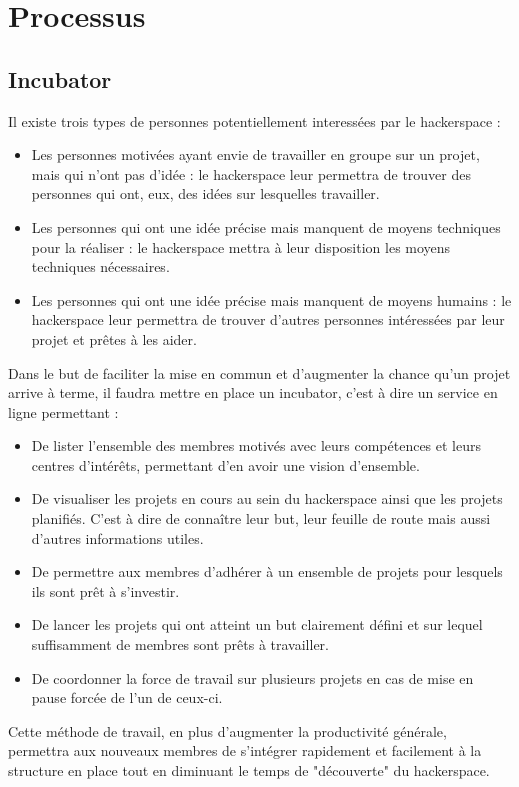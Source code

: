 \documentclass{article}
\begin{document}
\section{Processus}
\subsection{Incubator}

Il existe trois types de personnes potentiellement interessées par le hackerspace :
\begin{itemize}
\item Les personnes motivées ayant envie de travailler en groupe sur un projet, mais qui n'ont pas d'idée : 
le hackerspace leur permettra de trouver des personnes qui ont, eux, des idées sur lesquelles travailler.
\item Les personnes qui ont une idée précise mais manquent de moyens techniques pour la réaliser : 
le hackerspace mettra à leur disposition les moyens techniques nécessaires.
\item Les personnes qui ont une idée précise mais manquent de moyens humains : 
le hackerspace leur permettra de trouver d'autres personnes intéressées par leur projet et prêtes à les aider.
\end{itemize}

Dans le but de faciliter la mise en commun et d'augmenter la chance qu'un projet 
arrive à terme, il faudra mettre en place un incubator, c'est à dire un service en ligne permettant :
\begin{itemize}
\item De lister l'ensemble des membres motivés avec leurs compétences et leurs 
centres d'intérêts, permettant d'en avoir une vision d'ensemble.
\item De visualiser les projets en cours au sein du hackerspace ainsi que les projets planifiés. C'est à dire de connaître leur but, leur feuille de route mais aussi d'autres informations utiles. 
\item De permettre aux membres d'adhérer à un ensemble de projets pour lesquels ils sont prêt à s'investir.
\item De lancer les projets qui ont atteint un but clairement défini et sur lequel suffisamment de membres sont prêts à travailler.
\item De coordonner la force de travail sur plusieurs projets en cas de mise en pause forcée de l'un de ceux-ci.
\end{itemize}

Cette méthode de travail, en plus d'augmenter la productivité générale, permettra 
aux nouveaux membres de s'intégrer rapidement et facilement à la structure en place tout en diminuant 
le temps de "découverte" du hackerspace.
\end{document}
